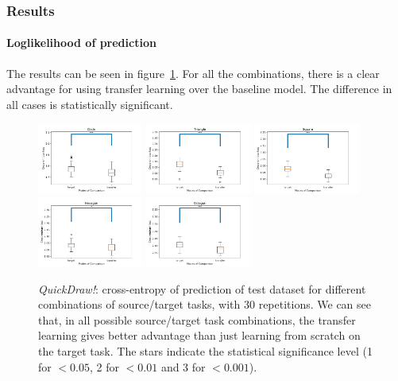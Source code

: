     \subsubsection{Results}
      \paragraph{Loglikelihood of prediction}
        The results can be seen in figure~\ref{fig:quickdraw_crossentropy}. For all the combinations, there is a clear advantage for using transfer learning over the baseline model. The difference in all cases is statistically significant.
        \begin{figure}
          \centering
            \includegraphics[width=0.31\textwidth]{images/sota/quickdraw_results/cir_ce.png}\quad
            \includegraphics[width=0.31\textwidth]{images/sota/quickdraw_results/tri_ce.png}\quad
            \includegraphics[width=0.31\textwidth]{images/sota/quickdraw_results/sq_ce.png}\quad
            \includegraphics[width=0.31\textwidth]{images/sota/quickdraw_results/hex_ce.png}\quad
            \includegraphics[width=0.31\textwidth]{images/sota/quickdraw_results/oct_ce.png}\quad
          \caption{\textit{QuickDraw!}: cross-entropy of prediction of test dataset for different combinations of source/target tasks, with 30 repetitions. We can see that, in all possible source/target task combinations, the transfer learning gives better advantage than just learning from scratch on the target task. The stars indicate the statistical significance level (1 for $<0.05$, 2 for $<0.01$ and 3 for $<0.001$).}
          \label{fig:quickdraw_crossentropy}
        \end{figure}

